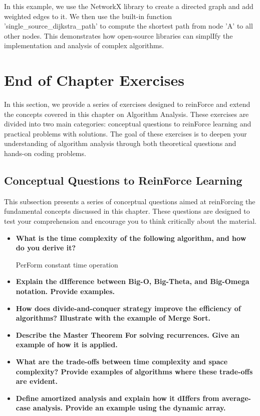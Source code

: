 \documentclass[12pt]{book} %
\begin{document}
In this example, we use the NetworkX library to create a directed graph and add weighted edges to it. We then use the built-in function 'single\_source\_dijkstra\_path' to compute the shortest path from node 'A' to all other nodes. This demonstrates how open-source libraries can simplIfy the implementation and analysis of complex algorithms.

\section{End of Chapter Exercises}
In this section, we provide a series of exercises designed to reinForce and extend the concepts covered in this chapter on Algorithm Analysis. These exercises are divided into two main categories: conceptual questions to reinForce learning and practical problems with solutions. The goal of these exercises is to deepen your understanding of algorithm analysis through both theoretical questions and hands-on coding problems.

\subsection{Conceptual Questions to ReinForce Learning}
This subsection presents a series of conceptual questions aimed at reinForcing the fundamental concepts discussed in this chapter. These questions are designed to test your comprehension and encourage you to think critically about the material.

\begin{itemize}
    \item \textbf{What is the time complexity of the following algorithm, and how do you derive it?} 
    \begin{algorithm}
    \caption{Sample Algorithm}
    \begin{algorithmic}
                \State PerForm constant time operation
            \EndFor
        \EndFor
    \end{algorithmic}
    \end{algorithm}
    \item \textbf{Explain the dIfference between Big-O, Big-Theta, and Big-Omega notation. Provide examples.}
    \item \textbf{How does divide-and-conquer strategy improve the efficiency of algorithms? Illustrate with the example of Merge Sort.}
    \item \textbf{Describe the Master Theorem For solving recurrences. Give an example of how it is applied.}
    \item \textbf{What are the trade-offs between time complexity and space complexity? Provide examples of algorithms where these trade-offs are evident.}
    \item \textbf{Define amortized analysis and explain how it dIffers from average-case analysis. Provide an example using the dynamic array.}
\end{itemize}
\end{document}
